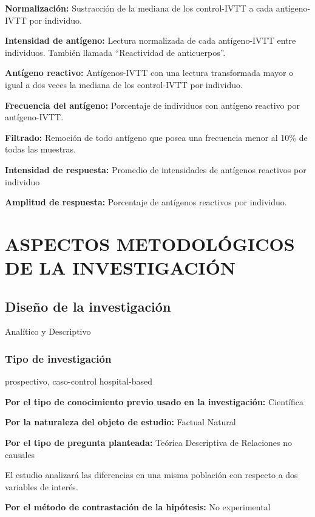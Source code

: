 \documentclass[]{article}
\begin{document}
\textbf{Normalización:} Sustracción de la mediana de los control-IVTT a
cada antígeno-IVTT por individuo.

\textbf{Intensidad de antígeno:} Lectura normalizada de cada
antígeno-IVTT entre individuos. También llamada ``Reactividad de
anticuerpos''.

\textbf{Antígeno reactivo:} Antígenos-IVTT con una lectura transformada
mayor o igual a dos veces la mediana de los control-IVTT por individuo.

\textbf{Frecuencia del antígeno:} Porcentaje de individuos con antígeno
reactivo por antígeno-IVTT.

\textbf{Filtrado:} Remoción de todo antígeno que posea una frecuencia
menor al 10\% de todas las muestras.

\textbf{Intensidad de respuesta:} Promedio de intensidades de antígenos
reactivos por individuo

\textbf{Amplitud de respuesta:} Porcentaje de antígenos reactivos por
individuo.

\section{ASPECTOS METODOLÓGICOS DE LA
INVESTIGACIÓN}\label{aspectos-metodologicos-de-la-investigacion}

\subsection{Diseño de la
investigación}\label{diseno-de-la-investigacion}

Analítico y Descriptivo

\subsubsection{Tipo de investigación}\label{tipo-de-investigacion}

prospectivo, caso-control hospital-based

\textbf{Por el tipo de conocimiento previo usado en la investigación:}
Científica

\textbf{Por la naturaleza del objeto de estudio:} Factual Natural

\textbf{Por el tipo de pregunta planteada:} Teórica Descriptiva de
Relaciones no causales

El estudio analizará las diferencias en una misma población con respecto
a dos variables de interés.

\textbf{Por el método de contrastación de la hipótesis:} No experimental
\end{document}
